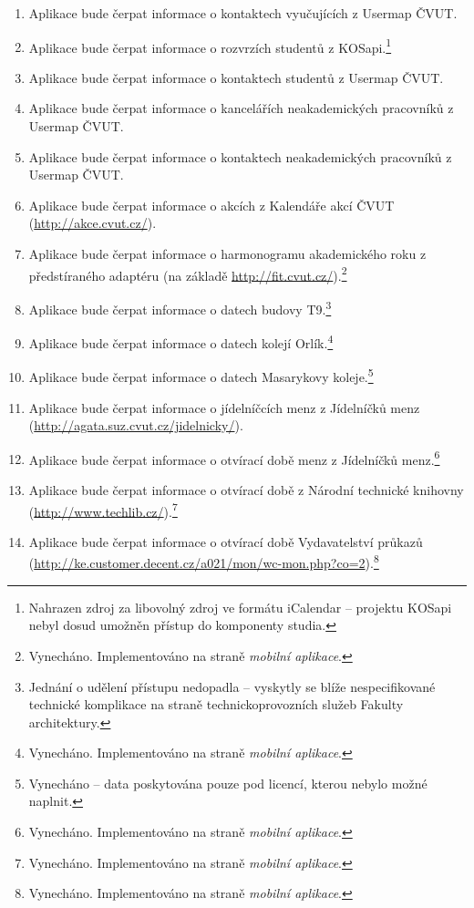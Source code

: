 \begin{enumerate}
 \item Aplikace bude čerpat informace o kontaktech vyučujících z Usermap ČVUT.
 \item Aplikace bude čerpat informace o rozvrzích studentů z KOSapi.\footnote{Nahrazen zdroj za libovolný zdroj ve formátu iCalendar -- projektu KOSapi nebyl dosud umožněn přístup do komponenty studia.}
 \item Aplikace bude čerpat informace o kontaktech studentů z Usermap ČVUT.
 \item Aplikace bude čerpat informace o kancelářích neakademických pracovníků z Usermap ČVUT.
 \item Aplikace bude čerpat informace o kontaktech neakademických pracovníků z Usermap ČVUT.
 \item Aplikace bude čerpat informace o akcích  z Kalendáře akcí ČVUT (\url{http://akce.cvut.cz/}).
 \item Aplikace bude čerpat informace o harmonogramu akademického roku z předstíraného adaptéru (na základě \url{http://fit.cvut.cz/}).\footnote{Vynecháno. Implementováno na straně \textit{mobilní aplikace}.}
 \item Aplikace bude čerpat informace o datech  budovy T9.\footnote{Jednání o udělení přístupu nedopadla -- vyskytly se blíže nespecifikované technické komplikace na straně technickoprovozních služeb Fakulty architektury.}
 \item Aplikace bude čerpat informace o datech  kolejí Orlík.\footnote{Vynecháno. Implementováno na straně \textit{mobilní aplikace}.}
 \item Aplikace bude čerpat informace o datech  Masarykovy koleje.\footnote{Vynecháno -- data poskytována pouze pod licencí, kterou nebylo možné naplnit.}
 \item Aplikace bude čerpat informace o jídelníčcích menz z Jídelníčků menz (\url{http://agata.suz.cvut.cz/jidelnicky/}).
 \item Aplikace bude čerpat informace o otvírací době menz z Jídelníčků menz.\footnote{Vynecháno. Implementováno na straně \textit{mobilní aplikace}.}
 \item Aplikace bude čerpat informace o otvírací době  z Národní technické knihovny (\url{http://www.techlib.cz/}).\footnote{Vynecháno. Implementováno na straně \textit{mobilní aplikace}.}
 \item Aplikace bude čerpat informace o otvírací době Vydavatelství průkazů (\url{http://ke.customer.decent.cz/a021/mon/wc-mon.php?co=2}).\footnote{Vynecháno. Implementováno na straně \textit{mobilní aplikace}.}

\end{enumerate}
